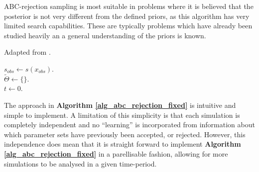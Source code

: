 \documentclass[11pt,a4paper]{article}
\theoremstyle{break}
\begin{document}
  \par ABC-rejection sampling is most suitable in problems where it is believed that the posterior is not very different from the defined priors, as this algorithm has very limited search capabilities. These are typically problems which have already been studied heavily an a general understanding of the priors is known.

  \begin{box_algorithm}\label{alg_abc_rejection_fixed}
    Adapted from \cite[]{ABC_in_population_genetics}.
    \par
    \begin{algorithm}[H]
      $s_{obs}\leftarrow s(x_{obs})$.\\
      $\tilde\Theta\leftarrow\{\}$.\\
      $t\leftarrow0$.\\
    \end{algorithm}
  \end{box_algorithm}

  \par The approach in \textbf{Algorithm \ref{alg_abc_rejection_fixed}} is intuitive and simple to implement. A limitation of this simplicity is that each simulation is completely independent and no ``learning'' is incorporated from information about which parameter sets have previously been accepted, or rejected. However, this independence does mean that it is straight forward to implement \textbf{Algorithm \ref{alg_abc_rejection_fixed}} in a parellisable fashion, allowing for more simulations to be analysed in a given time-period.
\end{document}
